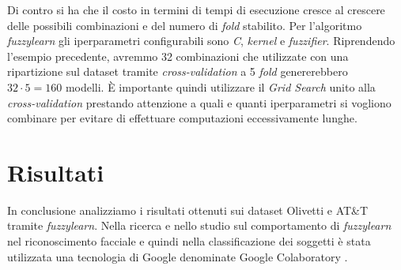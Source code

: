 \documentclass[12pt,italian]{report}
\begin{document}
Di contro si ha che il costo in termini di tempi di esecuzione cresce al crescere delle possibili combinazioni e del numero di \emph{fold} stabilito. Per l'algoritmo \emph{fuzzylearn} gli iperparametri configurabili sono \emph{C}, \emph{kernel} e \emph{fuzzifier}. Riprendendo l'esempio precedente, avremmo 32 combinazioni che utilizzate con una ripartizione sul dataset tramite \emph{cross-validation} a 5 \emph{fold} genererebbero $32 \cdot 5 = 160$ modelli.
È importante quindi utilizzare il \emph{Grid Search} unito alla \emph{cross-validation} prestando attenzione a quali e quanti iperparametri si vogliono combinare per evitare di effettuare computazioni eccessivamente lunghe.


\section{Risultati}
In conclusione analizziamo i risultati ottenuti sui dataset Olivetti e AT\&T tramite \emph{fuzzylearn}. Nella ricerca e nello studio sul comportamento di \emph{fuzzylearn} nel riconoscimento facciale e quindi nella classificazione dei soggetti è stata utilizzata una tecnologia di Google denominate Google Colaboratory \cite{google_colab}.
\end{document}
